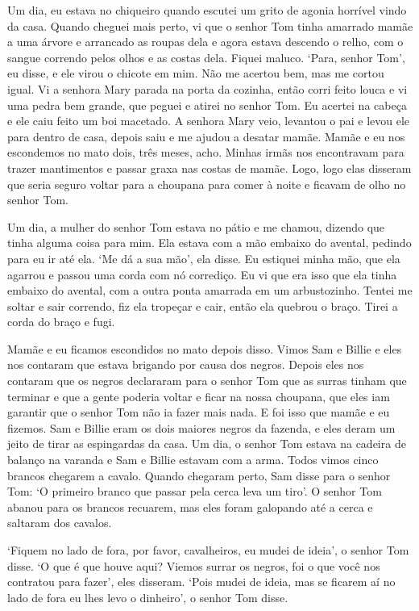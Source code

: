 Um dia, eu estava no chiqueiro quando escutei um grito de agonia
horrível vindo da casa. Quando cheguei mais perto, vi que o senhor Tom
tinha amarrado mamãe a uma árvore e arrancado as roupas dela e agora
estava descendo o relho, com o sangue correndo pelos olhos e as costas
dela. Fiquei maluco. `Para, senhor Tom', eu disse, e ele virou o chicote
em mim. Não me acertou bem, mas me cortou igual. Vi a senhora Mary
parada na porta da cozinha, então corri feito louca e vi uma pedra bem
grande, que peguei e atirei no senhor Tom. Eu acertei na cabeça e ele
caiu feito um boi macetado. A senhora Mary veio, levantou o pai e levou
ele para dentro de casa, depois saiu e me ajudou a desatar mamãe. Mamãe
e eu nos escondemos no mato dois, três meses, acho. Minhas irmãs nos
encontravam para trazer mantimentos e passar graxa nas costas de mamãe.
Logo, logo elas disseram que seria seguro voltar para a choupana para
comer à noite e ficavam de olho no senhor Tom.

Um dia, a mulher do senhor Tom estava no pátio e me chamou, dizendo que
tinha alguma coisa para mim. Ela estava com a mão embaixo do avental,
pedindo para eu ir até ela. `Me dá a sua mão', ela disse. Eu estiquei
minha mão, que ela agarrou e passou uma corda com nó corrediço. Eu vi
que era isso que ela tinha embaixo do avental, com a outra ponta
amarrada em um arbustozinho. Tentei me soltar e sair correndo, fiz ela
tropeçar e cair, então ela quebrou o braço. Tirei a corda do braço e
fugi.

Mamãe e eu ficamos escondidos no mato depois disso. Vimos Sam e Billie e
eles nos contaram que estava brigando por causa dos negros. Depois eles
nos contaram que os negros declararam para o senhor Tom que as surras
tinham que terminar e que a gente poderia voltar e ficar na nossa
choupana, que eles iam garantir que o senhor Tom não ia fazer mais nada.
E foi isso que mamãe e eu fizemos. Sam e Billie eram os dois maiores
negros da fazenda, e eles deram um jeito de tirar as espingardas da
casa. Um dia, o senhor Tom estava na cadeira de balanço na varanda e Sam
e Billie estavam com a arma. Todos vimos cinco brancos chegarem a
cavalo. Quando chegaram perto, Sam disse para o senhor Tom: `O primeiro
branco que passar pela cerca leva um tiro'. O senhor Tom abanou para os
brancos recuarem, mas eles foram galopando até a cerca e saltaram dos
cavalos.

`Fiquem no lado de fora, por favor, cavalheiros, eu mudei de ideia', o
senhor Tom disse. `O que é que houve aqui? Viemos surrar os negros, foi
o que você nos contratou para fazer', eles disseram. `Pois mudei de
ideia, mas se ficarem aí no lado de fora eu lhes levo o dinheiro', o
senhor Tom disse.

